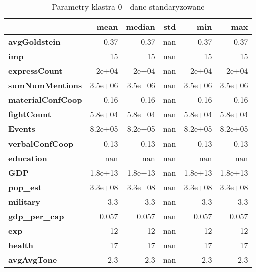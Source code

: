 \begin{table}
    \centering
    \caption{Parametry klastra 0 - dane standaryzowane}
    \label{tab:cl0std_desc}
    \begin{tabular}{lrrrrr}
        \toprule
        {}                        & mean    & median  & std & min     & max     \\
        \midrule
        \textbf{avgGoldstein    }     & 0.37    & 0.37    & nan & 0.37    & 0.37    \\
        \textbf{imp             }              & 15      & 15      & nan & 15      & 15      \\
        \textbf{expressCount    }     & 2e+04   & 2e+04   & nan & 2e+04   & 2e+04   \\
        \textbf{sumNumMentions  }   & 3.5e+06 & 3.5e+06 & nan & 3.5e+06 & 3.5e+06 \\
        \textbf{materialConfCoop} & 0.16    & 0.16    & nan & 0.16    & 0.16    \\
        \textbf{fightCount      }       & 5.8e+04 & 5.8e+04 & nan & 5.8e+04 & 5.8e+04 \\
        \textbf{Events          }           & 8.2e+05 & 8.2e+05 & nan & 8.2e+05 & 8.2e+05 \\
        \textbf{verbalConfCoop  }   & 0.13    & 0.13    & nan & 0.13    & 0.13    \\
        \textbf{education       }        & nan     & nan     & nan & nan     & nan     \\
        \textbf{GDP             }              & 1.8e+13 & 1.8e+13 & nan & 1.8e+13 & 1.8e+13 \\
        \textbf{pop\_est         }         & 3.3e+08 & 3.3e+08 & nan & 3.3e+08 & 3.3e+08 \\
        \textbf{military        }         & 3.3     & 3.3     & nan & 3.3     & 3.3     \\
        \textbf{gdp\_per\_cap     }    & 0.057   & 0.057   & nan & 0.057   & 0.057   \\
        \textbf{exp             }              & 12      & 12      & nan & 12      & 12      \\
        \textbf{health          }           & 17      & 17      & nan & 17      & 17      \\
        \textbf{avgAvgTone      }       & -2.3    & -2.3    & nan & -2.3    & -2.3    \\
        \bottomrule
    \end{tabular}
\end{table}

